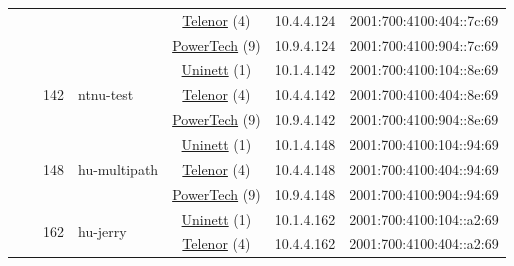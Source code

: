\begin{small}
\begin{center}
\begin{longtable}{|c|c|c|c|c|c|c|c|}
  &  &  &  & \multicolumn{2}{|c|}{\tiny{\href{https://www.telenor.no}{Telenor} (4)}} & \tiny{10.4.4.124} & \tiny{2001:700:4100:404::7c:69} \\* \cline{5-5}\cline{6-6}\cline{7-7}\cline{8-8}
  &  &  &  & \multicolumn{2}{|c|}{\tiny{\href{http://www.powertech.no}{PowerTech} (9)}} & \tiny{10.9.4.124} & \tiny{2001:700:4100:904::7c:69} \\* \cline{3-3}\cline{4-4}\cline{5-5}\cline{6-6}\cline{7-7}\cline{8-8}
  &  & \multirow{3}{*}{\tiny{142}} & \multicolumn{1}{|l|}{\multirow{3}{*}{\tiny{ntnu-test}}} & \multicolumn{2}{|c|}{\tiny{\href{https://www.uninett.no}{Uninett} (1)}} & \tiny{10.1.4.142} & \tiny{2001:700:4100:104::8e:69} \\* \cline{5-5}\cline{6-6}\cline{7-7}\cline{8-8}
  &  &  &  & \multicolumn{2}{|c|}{\tiny{\href{https://www.telenor.no}{Telenor} (4)}} & \tiny{10.4.4.142} & \tiny{2001:700:4100:404::8e:69} \\* \cline{5-5}\cline{6-6}\cline{7-7}\cline{8-8}
  &  &  &  & \multicolumn{2}{|c|}{\tiny{\href{http://www.powertech.no}{PowerTech} (9)}} & \tiny{10.9.4.142} & \tiny{2001:700:4100:904::8e:69} \\* \cline{3-3}\cline{4-4}\cline{5-5}\cline{6-6}\cline{7-7}\cline{8-8}
  &  & \multirow{3}{*}{\tiny{148}} & \multicolumn{1}{|l|}{\multirow{3}{*}{\tiny{hu-multipath}}} & \multicolumn{2}{|c|}{\tiny{\href{https://www.uninett.no}{Uninett} (1)}} & \tiny{10.1.4.148} & \tiny{2001:700:4100:104::94:69} \\* \cline{5-5}\cline{6-6}\cline{7-7}\cline{8-8}
  &  &  &  & \multicolumn{2}{|c|}{\tiny{\href{https://www.telenor.no}{Telenor} (4)}} & \tiny{10.4.4.148} & \tiny{2001:700:4100:404::94:69} \\* \cline{5-5}\cline{6-6}\cline{7-7}\cline{8-8}
  &  &  &  & \multicolumn{2}{|c|}{\tiny{\href{http://www.powertech.no}{PowerTech} (9)}} & \tiny{10.9.4.148} & \tiny{2001:700:4100:904::94:69} \\* \cline{3-3}\cline{4-4}\cline{5-5}\cline{6-6}\cline{7-7}\cline{8-8}
  &  & \multirow{3}{*}{\tiny{162}} & \multicolumn{1}{|l|}{\multirow{3}{*}{\tiny{hu-jerry}}} & \multicolumn{2}{|c|}{\tiny{\href{https://www.uninett.no}{Uninett} (1)}} & \tiny{10.1.4.162} & \tiny{2001:700:4100:104::a2:69} \\* \cline{5-5}\cline{6-6}\cline{7-7}\cline{8-8}
  &  &  &  & \multicolumn{2}{|c|}{\tiny{\href{https://www.telenor.no}{Telenor} (4)}} & \tiny{10.4.4.162} & \tiny{2001:700:4100:404::a2:69} \\* \cline{5-5}\cline{6-6}\cline{7-7}\cline{8-8}

\end{longtable}
\end{center}
\end{small}
